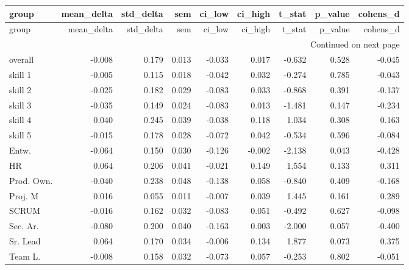 \begin{longtable}{lrrrrrrrr}
\toprule
group & mean\_delta & std\_delta & sem & ci\_low & ci\_high & t\_stat & p\_value & cohens\_d \\
\midrule
\endfirsthead
\toprule
group & mean\_delta & std\_delta & sem & ci\_low & ci\_high & t\_stat & p\_value & cohens\_d \\
\midrule
\endhead
\midrule
\multicolumn{9}{r}{Continued on next page} \\
\midrule
\endfoot
\bottomrule
\endlastfoot
overall & -0.008 & 0.179 & 0.013 & -0.033 & 0.017 & -0.632 & 0.528 & -0.045 \\
skill 1 & -0.005 & 0.115 & 0.018 & -0.042 & 0.032 & -0.274 & 0.785 & -0.043 \\
skill 2 & -0.025 & 0.182 & 0.029 & -0.083 & 0.033 & -0.868 & 0.391 & -0.137 \\
skill 3 & -0.035 & 0.149 & 0.024 & -0.083 & 0.013 & -1.481 & 0.147 & -0.234 \\
skill 4 & 0.040 & 0.245 & 0.039 & -0.038 & 0.118 & 1.034 & 0.308 & 0.163 \\
skill 5 & -0.015 & 0.178 & 0.028 & -0.072 & 0.042 & -0.534 & 0.596 & -0.084 \\
Entw. & -0.064 & 0.150 & 0.030 & -0.126 & -0.002 & -2.138 & 0.043 & -0.428 \\
HR & 0.064 & 0.206 & 0.041 & -0.021 & 0.149 & 1.554 & 0.133 & 0.311 \\
Prod. Own. & -0.040 & 0.238 & 0.048 & -0.138 & 0.058 & -0.840 & 0.409 & -0.168 \\
Proj. M & 0.016 & 0.055 & 0.011 & -0.007 & 0.039 & 1.445 & 0.161 & 0.289 \\
SCRUM & -0.016 & 0.162 & 0.032 & -0.083 & 0.051 & -0.492 & 0.627 & -0.098 \\
Sec. Ar. & -0.080 & 0.200 & 0.040 & -0.163 & 0.003 & -2.000 & 0.057 & -0.400 \\
Sr. Lead & 0.064 & 0.170 & 0.034 & -0.006 & 0.134 & 1.877 & 0.073 & 0.375 \\
Team L. & -0.008 & 0.158 & 0.032 & -0.073 & 0.057 & -0.253 & 0.802 & -0.051 \\
\end{longtable}
